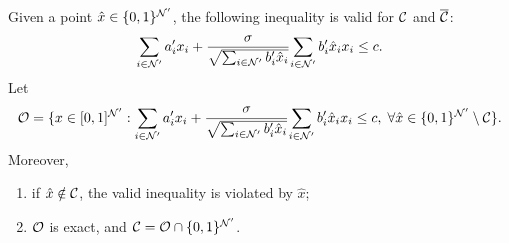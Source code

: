 \begin{theorem}
\label{lem.sep}
Given a point \(\hat{x} \in \{0,1\}^{\mathcal N'} \),  the following  inequality is valid for \(\mathcal C\) and $\overline{\mathcal C}$:
\begin{equation}
\label{eq.outercut}
	 \sum_{i \in \mathcal N'} a'_i x_i  + \frac{\sigma}{  \sqrt{\sum_{i\in \mathcal N'} b'_i \hat{x}_i}} {\sum_{i\in \mathcal N'} b'_i \hat{x}_i x_i}\le c.
\end{equation}
Let $$\mathcal O = \{x \in [0,1]^{\mathcal N'} :  \sum_{i \in \mathcal N'} a'_i x_i  + \frac{\sigma}{  \sqrt{\sum_{i\in \mathcal N'} b'_i \hat{x}_i}} {\sum_{i\in \mathcal N'} b'_i \hat{x}_i x_i}\le c, \; \forall \hat{x} \in \{0,1\}^{\mathcal N'} \setminus \mathcal C \}.$$
Moreover,
\begin{enumerate}
    \item if $\hat{x} \notin \mathcal C$, the valid inequality is violated by $\hat{x}$;
    \item  $\mathcal O$ is exact, and $\mathcal C = \mathcal O \cap \{0,1\}^{\mathcal N'}$.
\end{enumerate}
\end{theorem}
